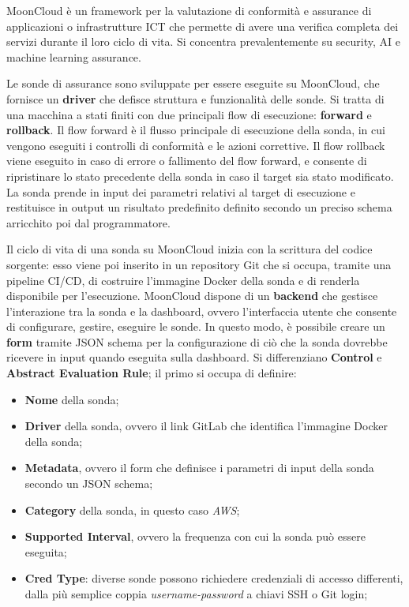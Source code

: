 MoonCloud è un framework per la valutazione di conformità e assurance di applicazioni o infrastrutture ICT che permette di avere una verifica completa dei servizi durante il loro ciclo di vita. Si concentra prevalentemente su security, AI e machine learning assurance.

Le sonde di assurance sono sviluppate per essere eseguite su MoonCloud, che fornisce un \textbf{driver} che defisce struttura e funzionalità delle sonde. Si tratta di una macchina a stati finiti con due principali flow di esecuzione: \textbf{forward} e \textbf{rollback}. Il flow forward è il flusso principale di esecuzione della sonda, in cui vengono eseguiti i controlli di conformità e le azioni correttive. Il flow rollback viene eseguito in caso di errore o fallimento del flow forward, e consente di ripristinare lo stato precedente della sonda in caso il target sia stato modificato. La sonda prende in input dei parametri relativi al target di esecuzione e restituisce in output un risultato predefinito definito secondo un preciso schema arricchito poi dal programmatore.

Il ciclo di vita di una sonda su MoonCloud inizia con la scrittura del codice sorgente: esso viene poi inserito in un repository Git che si occupa, tramite una pipeline CI/CD, di costruire l'immagine Docker della sonda e di renderla disponibile per l'esecuzione. MoonCloud dispone di un \textbf{backend} che gestisce l'interazione tra la sonda e la dashboard, ovvero l'interfaccia utente che consente di configurare, gestire, eseguire le sonde. In questo modo, è possibile creare un \textbf{form} tramite JSON schema per la configurazione di ciò che la sonda dovrebbe ricevere in input quando eseguita sulla dashboard. Si differenziano \textbf{Control} e \textbf{Abstract Evaluation Rule};
il primo si occupa di definire:

\begin{itemize}
    \item \textbf{Nome} della sonda;
    \item \textbf{Driver} della sonda, ovvero il link GitLab che identifica l'immagine Docker della sonda;
    \item \textbf{Metadata}, ovvero il form che definisce i parametri di input della sonda secondo un JSON schema;
    \item \textbf{Category} della sonda, in questo caso \textit{AWS};
    \item \textbf{Supported Interval}, ovvero la frequenza con cui la sonda può essere eseguita;
    \item \textbf{Cred Type}: diverse sonde possono richiedere credenziali di accesso differenti, dalla più semplice coppia \textit{username-password} a chiavi SSH o Git login;
\end{itemize}

